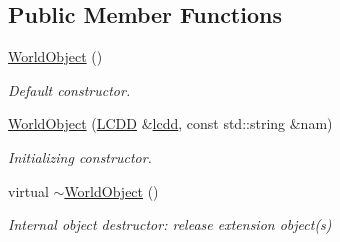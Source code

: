 \subsection*{Public Member Functions}
{\bf }\par
\begin{DoxyCompactItemize}
\item 
\hyperlink{class_d_d4hep_1_1_geometry_1_1_world_object_a69331daf3614dc0e3a5f7ff37164c8ef}{World\+Object} ()
\begin{DoxyCompactList}\small\item\em Default constructor. \end{DoxyCompactList}\item 
\hyperlink{class_d_d4hep_1_1_geometry_1_1_world_object_a2cdaba10494eab66ef9c4a5cd9152f31}{World\+Object} (\hyperlink{class_d_d4hep_1_1_geometry_1_1_l_c_d_d}{L\+C\+DD} \&\hyperlink{class_d_d4hep_1_1_geometry_1_1_world_object_a72d88491949f298897e034e2e5bc74df}{lcdd}, const std\+::string \&nam)
\begin{DoxyCompactList}\small\item\em Initializing constructor. \end{DoxyCompactList}\item 
virtual \hyperlink{class_d_d4hep_1_1_geometry_1_1_world_object_a287e5b87a26133cd35f3015268d2a5a3}{$\sim$\+World\+Object} ()
\begin{DoxyCompactList}\small\item\em Internal object destructor\+: release extension object(s) \end{DoxyCompactList}\end{DoxyCompactItemize}

